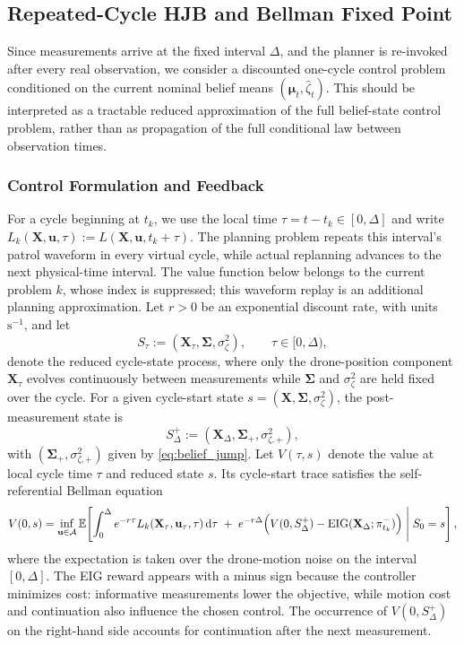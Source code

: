 \documentclass{article}
\newcommand{\E}{\mathbb{E}}
\newcommand{\dd}{\mathrm{d}}
\newcommand{\bs}[1]{\boldsymbol{#1}}
\renewcommand{\u}{\mathbf{u}}
\newcommand{\bX}{\mathbf{X}}
\begin{document}
\subsection{Repeated-Cycle HJB and Bellman Fixed Point}
\label{sec:hjb}

Since measurements arrive at the fixed interval $\Delta$, and the planner is re-invoked after every real observation, we consider a discounted one-cycle control problem conditioned on the current nominal belief means $(\bs\mu_t,\hat\zeta_t)$.
This should be interpreted as a tractable reduced approximation of the full belief-state control problem, rather than as propagation of the full conditional law between observation times.

\subsubsection{Control Formulation and Feedback}

For a cycle beginning at $t_k$, we use the local time $\tau=t-t_k\in[0,\Delta]$ and write $L_k(\bX,\u,\tau):=L(\bX,\u,t_k+\tau)$.
The planning problem repeats this interval's patrol waveform in every virtual cycle, while actual replanning advances to the next physical-time interval.
The value function below belongs to the current problem $k$, whose index is suppressed; this waveform replay is an additional planning approximation.
Let $r>0$ be an exponential discount rate, with units $\mathrm{s^{-1}}$, and let
\begin{equation}
S_\tau := (\bX_\tau,\bs\Sigma,\sigma_\zeta^2), \qquad \tau\in[0,\Delta),
\end{equation}
denote the reduced cycle-state process, where only the drone-position component $\bX_\tau$ evolves continuously between measurements while $\bs\Sigma$ and $\sigma_\zeta^2$ are held fixed over the cycle.
For a given cycle-start state $s=(\bX,\bs\Sigma,\sigma_\zeta^2)$, the post-measurement state is
\begin{equation}
S_\Delta^+ := (\bX_\Delta,\bs\Sigma_+,\sigma_{\zeta,+}^2),
\end{equation}
with $(\bs\Sigma_+,\sigma_{\zeta,+}^2)$ given by \eqref{eq:belief_jump}.
Let $V(\tau,s)$ denote the value at local cycle time $\tau$ and reduced state $s$.
Its cycle-start trace satisfies the self-referential Bellman equation
\begin{equation}
\label{eq:bellman}
V(0,s)
=
\inf_{\u\in\mathcal A}\E\!\left[
\int_0^\Delta e^{-r\tau}L_k(\bX_\tau,\u_\tau,\tau)\,\dd \tau
\;+\; e^{-r\Delta}\Bigl(V(0,S_\Delta^+) - \operatorname{EIG}(\bX_\Delta;\pi_{t_k}^-)\Bigr)
\;\middle|\; S_0=s
\right],
\end{equation}
where the expectation is taken over the drone-motion noise on the interval $[0,\Delta]$.
The EIG reward appears with a minus sign because the controller minimizes cost: informative measurements lower the objective, while motion cost and continuation also influence the chosen control.
The occurrence of $V(0,S_\Delta^+)$ on the right-hand side accounts for continuation after the next measurement.
\end{document}

